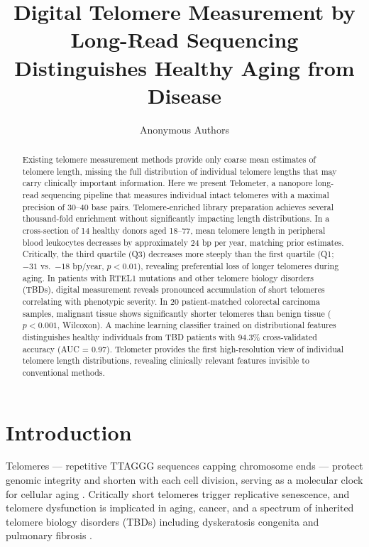 \documentclass[11pt]{article}
\title{Digital Telomere Measurement by Long-Read Sequencing Distinguishes Healthy Aging from Disease}
\author{Anonymous Authors}
\date{}
\begin{document}
\maketitle

\begin{abstract}
Existing telomere measurement methods provide only coarse mean estimates of telomere length, missing the full distribution of individual telomere lengths that may carry clinically important information. Here we present Telometer, a nanopore long-read sequencing pipeline that measures individual intact telomeres with a maximal precision of 30--40 base pairs. Telomere-enriched library preparation achieves several thousand-fold enrichment without significantly impacting length distributions. In a cross-section of 14 healthy donors aged 18--77, mean telomere length in peripheral blood leukocytes decreases by approximately 24 bp per year, matching prior estimates. Critically, the third quartile (Q3) decreases more steeply than the first quartile (Q1; $-31$ vs.\ $-18$ bp/year, $p < 0.01$), revealing preferential loss of longer telomeres during aging. In patients with RTEL1 mutations and other telomere biology disorders (TBDs), digital measurement reveals pronounced accumulation of short telomeres correlating with phenotypic severity. In 20 patient-matched colorectal carcinoma samples, malignant tissue shows significantly shorter telomeres than benign tissue ($p < 0.001$, Wilcoxon). A machine learning classifier trained on distributional features distinguishes healthy individuals from TBD patients with 94.3\% cross-validated accuracy (AUC = 0.97). Telometer provides the first high-resolution view of individual telomere length distributions, revealing clinically relevant features invisible to conventional methods.
\end{abstract}

\section{Introduction}

Telomeres --- repetitive TTAGGG sequences capping chromosome ends --- protect genomic integrity and shorten with each cell division, serving as a molecular clock for cellular aging \citep{blackburn2015telomeres, hayflick1961serial}. Critically short telomeres trigger replicative senescence, and telomere dysfunction is implicated in aging, cancer, and a spectrum of inherited telomere biology disorders (TBDs) including dyskeratosis congenita and pulmonary fibrosis \citep{shay2012role, armanios2012telomere, savage2008dyskeratosis}.
\end{document}
